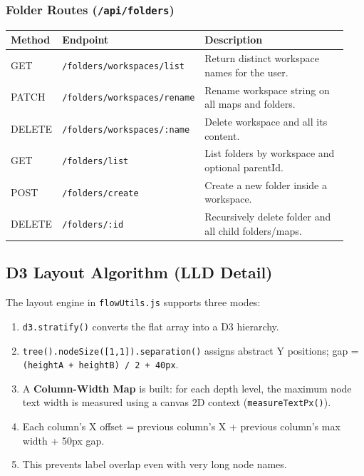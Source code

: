 \documentclass[12pt, a4paper]{article}
\begin{document}
\subsubsection{Folder Routes (\texttt{/api/folders})}
\begin{longtable}{p{0.09\linewidth} p{0.42\linewidth} p{0.43\linewidth}}
\toprule
\textbf{Method} & \textbf{Endpoint} & \textbf{Description} \\
\midrule
GET & \texttt{/folders/workspaces/list} & Return distinct workspace names for the user. \\
PATCH & \texttt{/folders/workspaces/rename} & Rename workspace string on all maps and folders. \\
DELETE & \texttt{/folders/workspaces/:name} & Delete workspace and all its content. \\
GET & \texttt{/folders/list} & List folders by workspace and optional parentId. \\
POST & \texttt{/folders/create} & Create a new folder inside a workspace. \\
DELETE & \texttt{/folders/:id} & Recursively delete folder and all child folders/maps. \\
\bottomrule
\end{longtable}

\subsection{D3 Layout Algorithm (LLD Detail)}
The layout engine in \texttt{flowUtils.js} supports three modes:

\begin{infobox}
\begin{enumerate}[noitemsep]
  \item \texttt{d3.stratify()} converts the flat array into a D3 hierarchy.
  \item \texttt{tree().nodeSize([1,1]).separation()} assigns abstract Y positions; gap = \texttt{(heightA + heightB) / 2 + 40px}.
  \item A \textbf{Column-Width Map} is built: for each depth level, the maximum node text width is measured using a canvas 2D context (\texttt{measureTextPx()}).
  \item Each column's X offset = previous column's X + previous column's max width + 50px gap.
  \item This prevents label overlap even with very long node names.
\end{enumerate}
\end{infobox}
\end{document}
